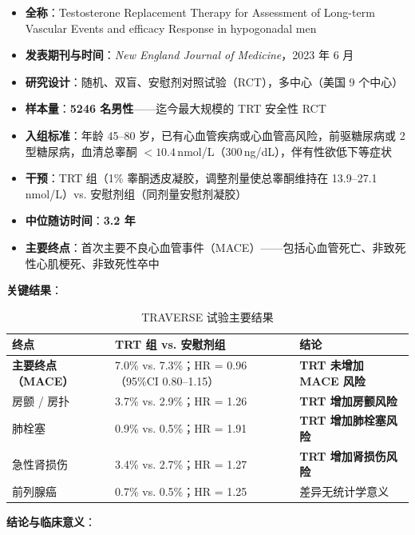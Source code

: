 \documentclass[12pt,a4paper,twoside]{ctexbook}
\begin{document}
\begin{itemize}[leftmargin=2cm]
	\item \textbf{全称}：Testosterone Replacement Therapy for Assessment of Long-term Vascular Events and efficacy Response in hypogonadal men
	\item \textbf{发表期刊与时间}：\textit{New England Journal of Medicine}，2023 年 6 月
	\item \textbf{研究设计}：随机、双盲、安慰剂对照试验（RCT），多中心（美国 9 个中心）
	\item \textbf{样本量}：\textbf{5246 名男性}——迄今最大规模的 TRT 安全性 RCT
	\item \textbf{入组标准}：年龄 45--80 岁，已有心血管疾病或心血管高风险，前驱糖尿病或 2 型糖尿病，血清总睾酮 $<10.4\,$nmol/L（300\,ng/dL），伴有性欲低下等症状
	\item \textbf{干预}：TRT 组（1\% 睾酮透皮凝胶，调整剂量使总睾酮维持在 13.9--27.1\,nmol/L）vs. 安慰剂组（同剂量安慰剂凝胶）
	\item \textbf{中位随访时间}：\textbf{3.2 年}
	\item \textbf{主要终点}：首次主要不良心血管事件（MACE）——包括心血管死亡、非致死性心肌梗死、非致死性卒中
\end{itemize}

\vspace{0.5em}
\noindent\textbf{关键结果}：

\begin{table}[htbp]
\centering
\caption{TRAVERSE 试验主要结果}
\label{tab:traverse_results}
\begin{tabularx}{\textwidth}{@{}lXX@{}}
    \toprule
    \textbf{终点} & \textbf{TRT 组 vs. 安慰剂组} & \textbf{结论} \\
    \midrule
    \textbf{主要终点（MACE）} & 7.0\% vs. 7.3\%；HR = 0.96（95\%CI 0.80--1.15） & \textbf{TRT 未增加 MACE 风险} \\
    房颤 / 房扑 & 3.7\% vs. 2.9\%；HR = 1.26 & \textbf{TRT 增加房颤风险} \\
    肺栓塞 & 0.9\% vs. 0.5\%；HR = 1.91 & \textbf{TRT 增加肺栓塞风险} \\
    急性肾损伤 & 3.4\% vs. 2.7\%；HR = 1.27 & \textbf{TRT 增加肾损伤风险} \\
    前列腺癌 & 0.7\% vs. 0.5\%；HR = 1.25 & 差异无统计学意义 \\
    \bottomrule
\end{tabularx}
\end{table}

\vspace{0.5em}
\noindent\textbf{结论与临床意义}：
\end{document}
